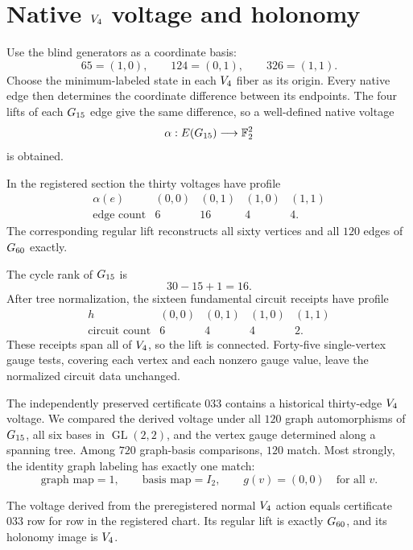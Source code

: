 \section{Native \(V_{4}\) voltage and holonomy}

Use the blind generators as a coordinate basis:
\[
  65=(1,0),\qquad
  124=(0,1),\qquad
  326=(1,1).
\]
Choose the minimum-labeled state in each \(V_{4}\) fiber as its
origin.  Every native edge then determines the coordinate difference
between its endpoints.  The four lifts of each \(G_{15}\) edge give
the same difference, so a well-defined native voltage
\[
  \alpha:E(G_{15})\longrightarrow\mathbb{F}_{2}^2
\]
is obtained.

In the registered section the thirty voltages have profile
\[
\begin{array}{c|rrrr}
\alpha(e)&(0,0)&(0,1)&(1,0)&(1,1)\\
\hline
\text{edge count}&6&16&4&4.
\end{array}
\]
The corresponding regular lift reconstructs all sixty vertices and all
\(120\) edges of \(G_{60}\) exactly.

The cycle rank of \(G_{15}\) is
\[
  30-15+1=16.
\]
After tree normalization, the sixteen fundamental circuit receipts
have profile
\[
\begin{array}{c|rrrr}
h&(0,0)&(0,1)&(1,0)&(1,1)\\
\hline
\text{circuit count}&6&4&4&2.
\end{array}
\]
These receipts span all of \(V_{4}\), so the lift is connected.
Forty-five single-vertex gauge tests, covering each vertex and each
nonzero gauge value, leave the normalized circuit data unchanged.

The independently preserved certificate 033 contains a historical
thirty-edge \(V_{4}\) voltage.  We compared the derived voltage under
all \(120\) graph automorphisms of \(G_{15}\), all six bases in
\(\operatorname{GL}(2,2)\), and the vertex gauge determined along a
spanning tree.  Among \(720\) graph-basis comparisons, \(120\) match.
Most strongly, the identity graph labeling has exactly one match:
\[
  \text{graph map}=1,\qquad
  \text{basis map}=I_2,\qquad
  g(v)=(0,0)\quad\text{for all }v.
\]

\begin{theorem}
The voltage derived from the preregistered normal \(V_{4}\) action
equals certificate 033 row for row in the registered chart.  Its
regular lift is exactly \(G_{60}\), and its holonomy image is
\(V_{4}\).
\end{theorem}
